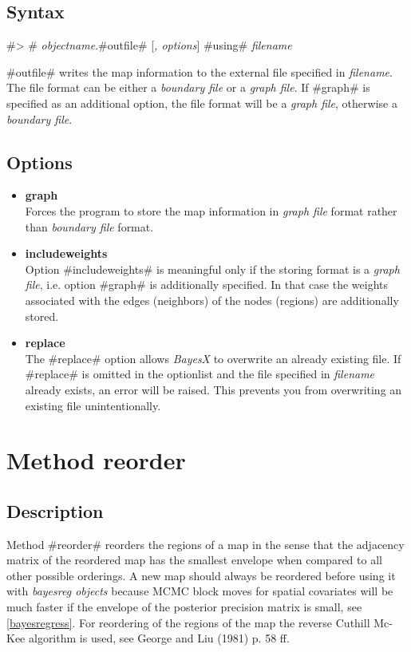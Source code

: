 \subsection*{Syntax}

#> # {\em objectname}.#outfile# [{\em , options}] #using# {\em filename}

#outfile# writes the map information to the external file
specified in {\em filename}. The file format can be either a {\em
boundary file} or a {\em graph file}. If #graph# is specified as
an additional option, the file format will be a {\em graph file},
otherwise a {\em boundary file}.

\subsection*{Options}

\begin{itemize}
\item {\bf graph} \\
Forces the program to store the map information in {\em graph
file} format rather than {\em boundary file} format.
\item {\bf includeweights} \\
Option #includeweights# is meaningful only if the storing format
is a {\em graph file}, i.e. option #graph# is additionally
specified. In that case the weights associated with the edges
(neighbors) of the nodes (regions) are additionally stored.
\item {\bf replace} \\
The #replace# option allows {\em BayesX} to overwrite an already
existing file. If #replace# is omitted in the optionlist and the
file specified in {\em filename} already exists, an error will be
raised. This prevents you from overwriting an existing file
unintentionally.
\end{itemize}


\section{Method reorder}
\label{mapreorder}  

\subsection*{Description}

Method #reorder# reorders the regions of a map in the sense that
the adjacency matrix of the reordered map has the smallest
envelope when compared to all other possible orderings. A new map
should always be reordered before using it with {\em bayesreg
objects} because MCMC block moves for spatial covariates will be
much faster if the envelope of the posterior precision matrix is
small, see \autoref{bayesregress}. For reordering of the regions
of the map the reverse Cuthill Mc-Kee algorithm is used, see
George and Liu (1981) p. 58 ff.


